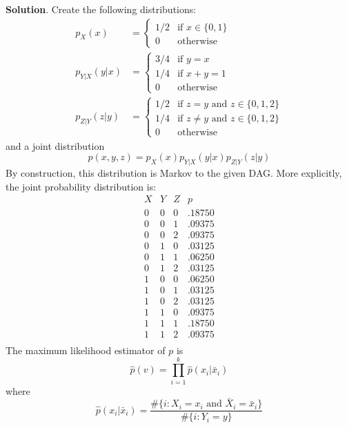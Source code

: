 \textbf{Solution}. Create the following distributions:
\begin{align*}
p_{X}(x) & = 
\begin{cases}
1/2 & \text{if } x \in \{0, 1\} \\
0 & \text{otherwise}
\end{cases}
\\
p_{Y | X}(y | x) & = 
\begin{cases}
3/4 & \text{if } y = x \\
1/4 & \text{if } x + y = 1 \\
0 & \text{otherwise}
\end{cases}
\\
p_{Z | Y}(z | y) & = 
\begin{cases}
1/2 &\text{if } z = y \text{ and } z \in \{ 0, 1, 2 \}\\
1/4 &\text{if } z \neq y \text{ and } z \in \{ 0, 1, 2 \} \\
0 &\text{otherwise}
\end{cases}
\end{align*}
and a joint distribution
\[
p(x, y, z) = p_{X}(x) p_{Y | X}(y | x) p_{Z | Y}(z | y)
\]
By construction, this distribution is Markov to the given DAG.
More explicitly, the joint probability distribution is:
\[
\begin{array}{ccc|c}
X & Y & Z & p \\
\hline
0 & 0 & 0 & .18750 \\
0 & 0 & 1 & .09375 \\
0 & 0 & 2 & .09375 \\
0 & 1 & 0 & .03125 \\
0 & 1 & 1 & .06250 \\
0 & 1 & 2 & .03125 \\
1 & 0 & 0 & .06250 \\
1 & 0 & 1 & .03125 \\
1 & 0 & 2 & .03125 \\
1 & 1 & 0 & .09375 \\
1 & 1 & 1 & .18750 \\
1 & 1 & 2 & .09375 \\
\end{array}
\]
The maximum likelihood estimator of \(p\) is
\[
\hat{p}(v) = \prod_{i=1}^{k} \hat{p}(x_{i} | \bar{x}_{i})
\]
where
\[
\hat{p}(x_{i} | \bar{x}_{i}) = \frac{\# \{i : X_{i} = x_{i} \text{ and } \bar{X}_{i} = \bar{x}_{i} \}}{\# \{i : Y_{i} = y \}}
\]

